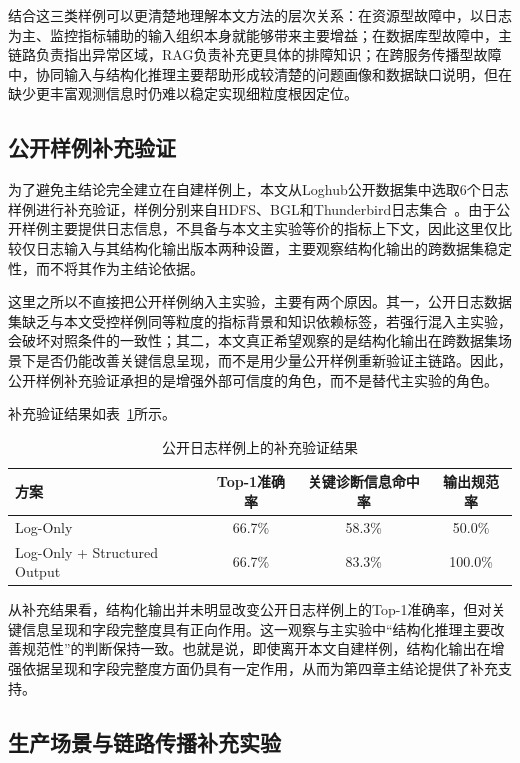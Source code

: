 结合这三类样例可以更清楚地理解本文方法的层次关系：在资源型故障中，以日志为主、监控指标辅助的输入组织本身就能够带来主要增益；在数据库型故障中，主链路负责指出异常区域，RAG负责补充更具体的排障知识；在跨服务传播型故障中，协同输入与结构化推理主要帮助形成较清楚的问题画像和数据缺口说明，但在缺少更丰富观测信息时仍难以稳定实现细粒度根因定位。

\subsection{公开样例补充验证}

为了避免主结论完全建立在自建样例上，本文从Loghub公开数据集中选取6个日志样例进行补充验证，样例分别来自HDFS、BGL和Thunderbird日志集合~\cite{he2020loghub,zhu2023loghub}。由于公开样例主要提供日志信息，不具备与本文主实验等价的指标上下文，因此这里仅比较仅日志输入与其结构化输出版本两种设置，主要观察结构化输出的跨数据集稳定性，而不将其作为主结论依据。

这里之所以不直接把公开样例纳入主实验，主要有两个原因。其一，公开日志数据集缺乏与本文受控样例同等粒度的指标背景和知识依赖标签，若强行混入主实验，会破坏对照条件的一致性；其二，本文真正希望观察的是结构化输出在跨数据集场景下是否仍能改善关键信息呈现，而不是用少量公开样例重新验证主链路。因此，公开样例补充验证承担的是增强外部可信度的角色，而不是替代主实验的角色。

补充验证结果如表~\ref{tab:public-results}所示。

\begin{table}[htbp]
\centering
\caption{公开日志样例上的补充验证结果}
\label{tab:public-results}
\small
\setlength{\tabcolsep}{5pt}
\renewcommand{\arraystretch}{1.12}
\begin{tabular}{lccc}
\toprule
方案 & Top-1准确率 & 关键诊断信息命中率 & 输出规范率 \\
\midrule
Log-Only & 66.7\% & 58.3\% & 50.0\% \\
Log-Only + Structured Output & 66.7\% & 83.3\% & 100.0\% \\
\bottomrule
\end{tabular}
\end{table}

从补充结果看，结构化输出并未明显改变公开日志样例上的Top-1准确率，但对关键信息呈现和字段完整度具有正向作用。这一观察与主实验中“结构化推理主要改善规范性”的判断保持一致。也就是说，即使离开本文自建样例，结构化输出在增强依据呈现和字段完整度方面仍具有一定作用，从而为第四章主结论提供了补充支持。

\subsection{生产场景与链路传播补充实验}


